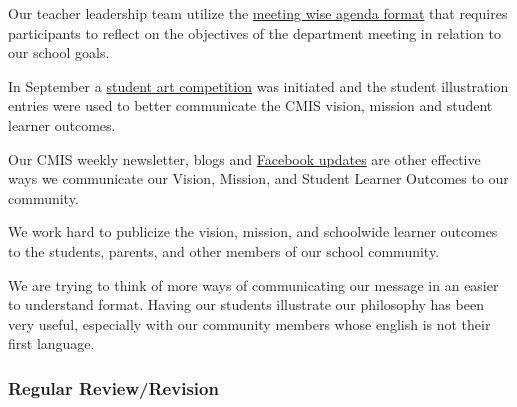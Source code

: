 \begin{findings}
Our teacher leadership team utilize the \href{https://drive.google.com/a/cmis.ac.th/file/d/0ByVFfrm0zfolT25VTjZZRzlXQjA/view?usp=sharing}{meeting wise agenda format} that requires participants to reflect on the objectives of the department meeting in relation to our school goals.

In September a \href{https://docs.google.com/a/cmis.ac.th/presentation/d/1bdi1LZUjWbGKOyB0XR9CGyoY2xLY39SZVKhiHTIJGxc/edit?usp=sharing}{student art competition} was initiated and the student illustration entries were used to better communicate the CMIS vision, mission and student learner outcomes.

Our CMIS weekly newsletter, blogs and \href{https://www.facebook.com/cmis.th/}{Facebook updates} are other effective ways we communicate our Vision, Mission, and Student Learner Outcomes to our community. 


We work hard to publicize the vision, mission, and schoolwide learner outcomes to the students, parents, and other members of our school community.

We are trying to think of more ways of communicating our message in an easier to understand format. Having our students illustrate our philosophy has been very useful, especially with our community members whose english is not their first language.
\end{findings}

\subsubsection{Regular Review/Revision}



